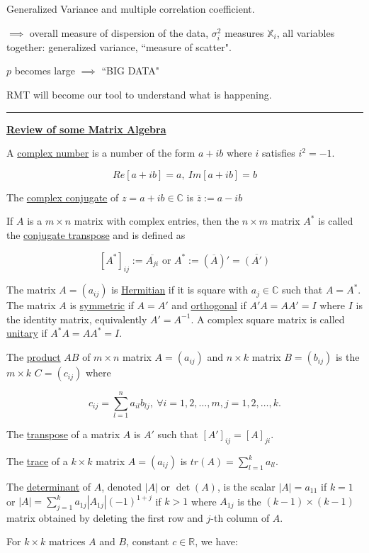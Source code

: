 \documentclass[twoside]{article}
\begin{document}
Generalized Variance and multiple correlation coefficient.

$\implies$ overall measure of dispersion of the data, $\sigma_i^2$ measures $\mathbb{X}_i$, all variables together: generalized variance, ``measure of scatter".

$p$ becomes large $\implies$ ``BIG DATA"

RMT will become our tool to understand what is happening.\\
\hrule
\underline{\textbf{Review of some Matrix Algebra}}

A \underline{complex number} is a number of the form $a+ib$ where $i$ satisfies $i^2=-1$.

$$Re[a+ib]=a,\ Im[a+ib]=b$$

The \underline{complex conjugate} of $z=a+ib\in\mathbb{C}$ is $\overline{z}:=a-ib$

If $A$ is a $m\times n$ matrix with complex entries, then the $n\times m$ matrix $A^*$ is called the \underline{conjugate transpose} and is defined as 

$$[A^*]_{ij}:=\overline{A_{ji}}\text{ or } A^*:=\left(\overline{A}\right)'=\overline{(A')}$$

The matrix $A=(a_{ij})$ is \underline{Hermitian} if it is square with $a_j\in\mathbb{C}$ such that $A=A^*$. The matrix $A$ is \underline{symmetric} if $A=A'$ and \underline{orthogonal} if $A'A=AA'=I$ where $I$ is the identity matrix, equivalently $A'=A^{-1}$. A complex square matrix is called \underline{unitary} if $A^*A=AA^*=I$.

The \underline{product} $AB$ of $m\times n$ matrix $A=(a_{ij})$ and $n\times k$ matrix $B=(b_{ij})$ is the $m\times k$ $C=(c_{ij})$ where

$$c_{ij}=\sum^n_{l=1}a_{il}b_{lj},\ \forall i =1,2,\dots, m, j=1,2,\dots, k.$$

The \underline{transpose} of a matrix $A$ is $A'$ such that $[A']_{ij}=[A]_{ji}$.

The \underline{trace} of a $k\times k$ matrix $A=(a_{ij})$ is $tr(A)=\sum^k_{l=1}a_{ll}$.

The \underline{determinant} of $A$, denoted $|A|$ or $\det(A)$, is the scalar $|A|=a_{11}$ if $k=1$ or $|A|=\sum^k_{j=1}a_{1j}|A_{1j}|(-1)^{1+j}$ if $k>1$ where $A_{1j}$ is the $(k-1)\times (k-1)$ matrix obtained by deleting the first row and $j$-th column of $A$.

For $k\times k$ matrices $A$ and $B$, constant $c\in\mathbb{R}$, we have:
\end{document}
